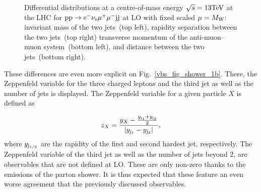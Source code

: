 \begin{figure}[htbp]
\begin{center}
\caption{Differential distributions at a centre-of-mass energy $\sqrt{s}=13{\rm TeV}$ at the LHC for ${\rm p} {\rm p}
  \to {\rm e}^-  \nu_{\rm e}  \mu^+ \mu^- {\rm j} {\rm j}$ at LO with fixed scaled $\mu = M_{\rm W}$: 
                invariant mass of the two jets~(top left),
                rapidity separation between the two jets~(top right)
                transverse momentum of the anti-muon--muon system~(bottom left), and
                distance between the two jets~(bottom right).}
\label{vbs_fig_shower_1a}
\end{center}
\end{figure}

These differences are even more explicit on Fig.~\ref{vbs_fig_shower_1b}.
There, the Zeppenfeld variable for the three charged leptons and the third jet as well as the number of jets is displayed.
The Zeppenfeld variable for a given particle $X$ is defined as

\begin{equation}
  z_{X} = \frac{y_{X}-\frac{y_{{\rm j}_1}+y_{{\rm j}_2}}2}{|y_{{\rm j}_1}-y_{{\rm j}_2}|} ,
\end{equation}
%
where $y_{{\rm j}_{1/2}}$ are the rapidity of the first and second hardest jet, respectively.
The Zeppenfeld variable of the third jet as well as the number of jets beyond 2, are observables that are not defined at LO.
These are only non-zero thanks to the emissions of the parton shower.
It is thus expected that these feature an even worse agreement that the previously discussed observables.

